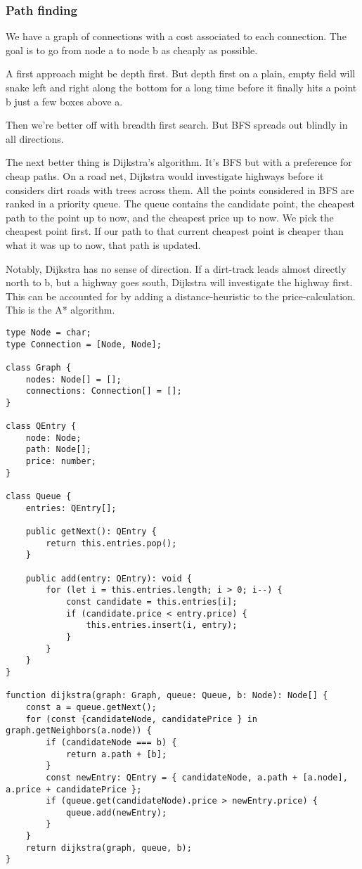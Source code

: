 \subsubsection{Path finding}
We have a graph of connections with a cost associated to each connection.
The goal is to go from node a to node b as cheaply as possible.

A first approach might be depth first. But depth first on a plain, empty field will snake left and right along the bottom 
for a long time before it finally hits a point b just a few boxes above a.

Then we're better off with breadth first search. But BFS spreads out blindly in all directions.

The next better thing is Dijkstra's algorithm. It's BFS but with a preference for cheap paths.
On a road net, Dijkstra would investigate highways before it considers dirt roads with trees across them.
All the points considered in BFS are ranked in a priority queue.
The queue contains the candidate point, the cheapest path to the point up to now, and the cheapest price up to now.
We pick the cheapest point first. If our path to that current cheapest point is cheaper than what it was up to now, that path is updated.

Notably, Dijkstra has no sense of direction.
If a dirt-track leads almost directly north to b, but a highway goes south, Dijkstra will investigate the highway first.
This can be accounted for by adding a distance-heuristic to the price-calculation.
This is the A* algorithm.

\begin{lstlisting}
type Node = char;
type Connection = [Node, Node];

class Graph {
    nodes: Node[] = [];
    connections: Connection[] = [];
}

class QEntry {
    node: Node;
    path: Node[];
    price: number;
}

class Queue {
    entries: QEntry[];

    public getNext(): QEntry {
        return this.entries.pop();
    }

    public add(entry: QEntry): void {
        for (let i = this.entries.length; i > 0; i--) {
            const candidate = this.entries[i];
            if (candidate.price < entry.price) {
                this.entries.insert(i, entry);
            }
        }
    }
}

function dijkstra(graph: Graph, queue: Queue, b: Node): Node[] {
    const a = queue.getNext();
    for (const {candidateNode, candidatePrice } in graph.getNeighbors(a.node)) {
        if (candidateNode === b) {
            return a.path + [b];
        }
        const newEntry: QEntry = { candidateNode, a.path + [a.node], a.price + candidatePrice };
        if (queue.get(candidateNode).price > newEntry.price) {
            queue.add(newEntry);
        }
    }
    return dijkstra(graph, queue, b);
}
\end{lstlisting}
